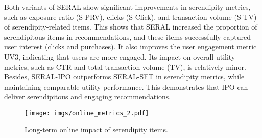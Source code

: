 Both variants of SERAL show significant improvements in serendipity metrics, such as exposure ratio (S-PRV), clicks (S-Click), and transaction volume (S-TV) of serendipity-related items. This shows that SERAL increased the proportion of serendipitous items in recommendations, and these items successfully captured user interest (clicks and purchases). It also improves the user engagement metric UV3, indicating that users are more engaged. Its impact on overall utility metrics, such as CTR and total transaction volume (TV), is relatively minor. Besides, SERAL-IPO outperforms SERAL-SFT in serendipity metrics, while maintaining comparable utility performance. This demonstrates that IPO can deliver serendipitous and engaging recommendations.
\begin{figure}
    \centering
    \vspace{-10pt}
    \texttt{[image: imgs/online\_metrics\_2.pdf]}
    \vspace{-20pt}
    \caption{Long-term online impact of serendipity items.}
    \vspace{-10pt}
    \label{fig:long_ab}
\end{figure}

